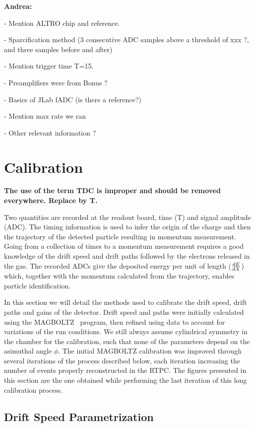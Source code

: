 \documentclass[twocolumn,showpacs,superscriptaddress,groupedaddress]{revtex4}
\begin{document}
{\bf \color{red} 
Andrea:

- Mention ALTRO chip and reference.

- Sparcification method (3 consecutive ADC samples above a threshold of xxx ?, and three
samples before and after) 

- Mention trigger time T=15.

- Preamplifiers were from Bonus ?

- Basics of JLab fADC (is there a reference?)

- Mention max rate we ran 

- Other relevant information ?
}

\section{Calibration} \label{sec_calib}

{\bf \color{red} The use of the term TDC is improper and should be removed
everywhere. Replace by T.}

Two quantities are recorded at the readout board, 
time (T) and signal amplitude (ADC). The timing information is used to infer 
the origin of the charge and then the trajectory of the detected particle
resulting in momentum measurement. Going from a collection of 
times to a momentum measurement requires a good knowledge of the drift speed 
and drift paths followed by the electrons released in the gas. The recorded ADCs give 
the deposited energy per unit of length ($\small{\frac{dE}{dX}}$) which, 
together with the momentum calculated from the trajectory, enables particle 
identification.

In this section we will detail the methods used to calibrate the drift speed,
drift paths and gains of the detector. Drift speed and paths were initially
calculated using the MAGBOLTZ~\cite{MAGBOLTZ} program, then refined using
data to account for variations of the run conditions. We still always assume 
cylindrical symmetry in the chamber for the calibration, such that none of
the parameters depend on the asimuthal angle $\phi$. The initial MAGBOLTZ
calibration was improved through several iterations of the
process described below, each iteration increasing the number of events 
properly reconstructed in the RTPC. The figures presented in this section
are the one obtained while performing the last iteration of this long 
calibration process.


\subsection{Drift Speed Parametrization}
\end{document}
